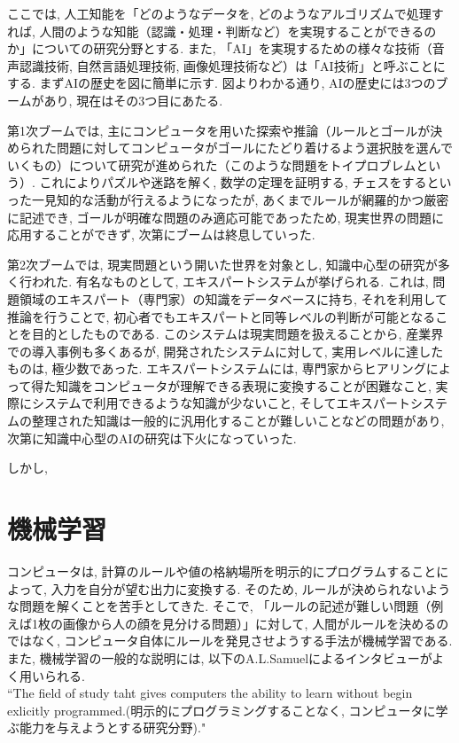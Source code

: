 \documentclass{suribt}
\begin{document}
ここでは, 人工知能を「どのようなデータを, どのようなアルゴリズムで処理すれば, 人間のような知能（認識・処理・判断など）を実現することができるのか」についての研究分野とする. また, 「AI」を実現するための様々な技術（音声認識技術, 自然言語処理技術, 画像処理技術など）は「AI技術」と呼ぶことにする.
まずAIの歴史を図に簡単に示す. 図よりわかる通り, AIの歴史には3つのブームがあり, 現在はその3つ目にあたる. 

第1次ブームでは, 主にコンピュータを用いた探索や推論（ルールとゴールが決められた問題に対してコンピュータがゴールにたどり着けるよう選択肢を選んでいくもの）について研究が進められた（このような問題をトイプロブレムという）. これによりパズルや迷路を解く, 数学の定理を証明する, チェスをするといった一見知的な活動が行えるようになったが, あくまでルールが網羅的かつ厳密に記述でき, ゴールが明確な問題のみ適応可能であったため, 現実世界の問題に応用することができず, 次第にブームは終息していった.

第2次ブームでは, 現実問題という開いた世界を対象とし, 知識中心型の研究が多く行われた. 有名なものとして, エキスパートシステムが挙げられる. これは, 問題領域のエキスパート（専門家）の知識をデータベースに持ち, それを利用して推論を行うことで, 初心者でもエキスパートと同等レベルの判断が可能となることを目的としたものである. このシステムは現実問題を扱えることから, 産業界での導入事例も多くあるが, 開発されたシステムに対して, 実用レベルに達したものは, 極少数であった\cite{Terano-2003}. エキスパートシステムには, 専門家からヒアリングによって得た知識をコンピュータが理解できる表現に変換することが困難なこと, 実際にシステムで利用できるような知識が少ないこと, そしてエキスパートシステムの整理された知識は一般的に汎用化することが難しいことなどの問題\cite{Terano-2003, Suwa-1986}があり, 次第に知識中心型のAIの研究は下火になっていった. 

しかし, 



\section{機械学習}
コンピュータは, 計算のルールや値の格納場所を明示的にプログラムすることによって, 入力を自分が望む出力に変換する. そのため, ルールが決められないような問題を解くことを苦手としてきた. そこで, 「ルールの記述が難しい問題（例えば1枚の画像から人の顔を見分ける問題）」に対して, 人間がルールを決めるのではなく, コンピュータ自体にルールを発見させようする手法が機械学習である. また, 機械学習の一般的な説明には, 以下のA.L.Samuelによるインタビューがよく用いられる\cite{Kamishima-2019}.\\
``The field of study taht gives computers the ability to learn without begin exlicitly programmed.(明示的にプログラミングすることなく, コンピュータに学ぶ能力を与えようとする研究分野)."
\end{document}
